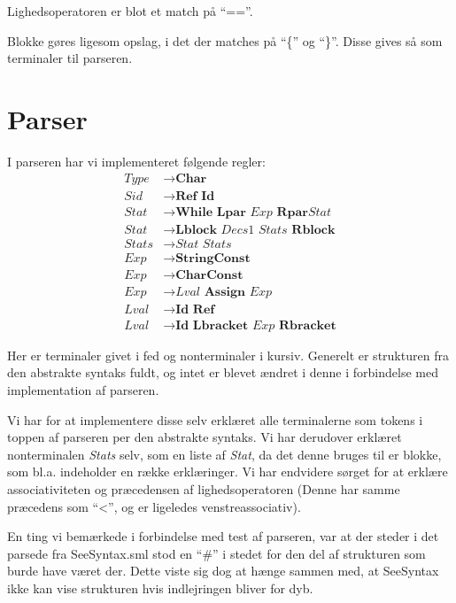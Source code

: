 \documentclass[a4paper, 10pt]{article}
\newcommand{\ra}[0]{\rightarrow}
\begin{document}
Lighedsoperatoren er blot et match på ``==''.

Blokke gøres ligesom opslag, i det der matches på ``\{'' og ``\}''. Disse gives
så som terminaler til parseren.

\section{Parser}
I parseren har vi implementeret følgende regler:
\begin{align*}
    \textit{Type}  & \ra \textbf{Char} \\
    \textit{Sid}   & \ra \textbf{Ref Id} \\
    \textit{Stat}  & \ra \textbf{While Lpar} \textit{ Exp } \textbf{Rpar}
                         \textit{Stat} \\
    \textit{Stat}  & \ra \textbf{Lblock} \textit{ Decs1 Stats } \textbf{Rblock} \\
    \textit{Stats} & \ra \textit{Stat Stats} \\
    \textit{Exp}   & \ra \textbf{StringConst} \\
    \textit{Exp}   & \ra \textbf{CharConst} \\
    \textit{Exp}   & \ra \textit{Lval} \textbf{ Assign } \textit{Exp} \\
    \textit{Lval}  & \ra \textbf{Id Ref} \\
    \textit{Lval}  & \ra \textbf{Id Lbracket} \textit{ Exp } \textbf{Rbracket}
\end{align*}

Her er terminaler givet i fed og nonterminaler i kursiv. Generelt er strukturen
fra den abstrakte syntaks fuldt, og intet er blevet ændret i denne i forbindelse med
implementation af parseren.

Vi har for at implementere disse selv erklæret alle terminalerne som tokens i 
toppen af parseren per den abstrakte syntaks. Vi har derudover erklæret
nonterminalen \textit{Stats} selv, som en liste af \textit{Stat}, da det denne
bruges til er blokke, som bl.a. indeholder en række erklæringer. Vi har endvidere
sørget for at erklære associativiteten og præcedensen af lighedsoperatoren 
(Denne har samme præcedens som ``<'', og er ligeledes venstreassociativ).

En ting vi bemærkede i forbindelse med test af parseren, var at der steder i det parsede fra
SeeSyntax.sml stod en ``#'' i stedet for den del af strukturen som burde have været
der. Dette viste sig dog at hænge sammen med, at SeeSyntax ikke kan vise
strukturen hvis indlejringen bliver for dyb.
\end{document}
